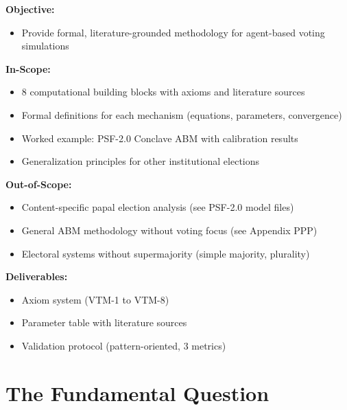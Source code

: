 \begin{tcolorbox}[
    colback=orange!5!white,
    colframe=orange!75!black,
    title={\textbf{Appendix Scope: Objective / In-Scope / Out-of-Scope / Deliverables}},
    fonttitle=\bfseries
]

\textbf{Objective:}
\begin{itemize}[nosep]
    \item Provide formal, literature-grounded methodology for agent-based voting simulations
\end{itemize}

\textbf{In-Scope:}
\begin{itemize}[nosep]
    \item 8 computational building blocks with axioms and literature sources
    \item Formal definitions for each mechanism (equations, parameters, convergence)
    \item Worked example: PSF-2.0 Conclave ABM with calibration results
    \item Generalization principles for other institutional elections
\end{itemize}

\textbf{Out-of-Scope:}
\begin{itemize}[nosep]
    \item Content-specific papal election analysis (see PSF-2.0 model files)
    \item General ABM methodology without voting focus (see Appendix PPP)
    \item Electoral systems without supermajority (simple majority, plurality)
\end{itemize}

\textbf{Deliverables:}
\begin{itemize}[nosep]
    \item Axiom system (VTM-1 to VTM-8)
    \item Parameter table with literature sources
    \item Validation protocol (pattern-oriented, 3 metrics)
\end{itemize}
\end{tcolorbox}


\section{The Fundamental Question}
\label{sec:bp-question}

